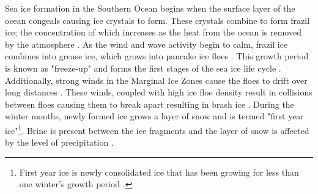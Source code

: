 Sea ice formation in the Southern Ocean begins when the surface layer of the ocean congeals causing ice crystals to form. These crystals combine to form frazil ice; the concentration of which increases as the heat from the ocean is removed by the atmosphere \cite{arrigo2004large}. As the wind and wave activity begin to calm, frazil ice combines into grease ice, which grows into pancake ice floes \cite{arrigo2004large}. This growth period is known as "freeze-up" and forms the first stages of the sea ice life cycle \cite{barber2005microwave}. Additionally, strong winds in the Marginal Ice Zones cause the floes to drift over long distances \cite{alberello2019drift}. These winds, coupled with high ice floe density result in collisions between floes causing them to break apart \cite{STEER2008933} resulting in brash ice \cite{icedefinition1992}.  During the winter months, newly formed ice grows a layer of snow \cite{barber2005microwave} and is termed "first year ice"\footnote{First year ice is newly consolidated ice that has been growing for less than one winter's growth period \cite{icedefinition1992}.}. Brine is present between the ice fragments and the layer of snow is affected by the level of precipitation \cite{barber2005microwave}.\par

